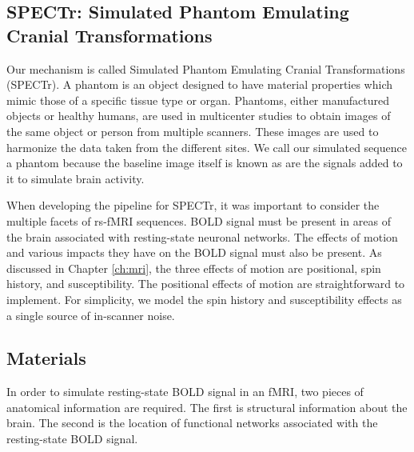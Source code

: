 
\subsection{SPECTr: Simulated Phantom Emulating Cranial Transformations}

Our mechanism is called Simulated Phantom Emulating Cranial Transformations (SPECTr). A phantom is an object designed to have material properties which mimic those of a specific tissue type or organ. Phantoms, either manufactured objects or healthy humans, are used in multicenter studies to obtain images of the same object or person from multiple scanners. These images are used to harmonize the data taken from the different sites. We call our simulated sequence a phantom because the baseline image itself is known as are the signals added to it to simulate brain activity. 

When developing the pipeline for SPECTr, it was important to consider the multiple facets of rs-fMRI sequences. BOLD signal must be present in areas of the brain associated with resting-state neuronal networks. The effects of motion and various impacts they have on the BOLD signal must also be present. As discussed in Chapter \ref{ch:mri}, the three effects of motion are positional, spin history, and susceptibility. The positional effects of motion are straightforward to implement. For simplicity, we model the spin history and susceptibility effects as a single source of in-scanner noise. 

\subsection{Materials}

In order to simulate resting-state BOLD signal in an fMRI, two pieces of anatomical information are required. The first is structural information about the brain. The second is the location of functional networks associated with the resting-state BOLD signal.

